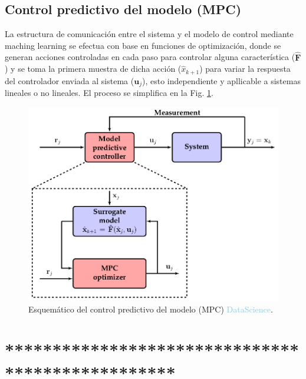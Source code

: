 \subsection*{Control predictivo del modelo (MPC)}

La estructura de comunicación entre el sistema y el modelo de control mediante maching learning se efectua con base en funciones de optimización, donde se generan acciones controladas en cada paso para controlar alguna característica ($\mathbf{\hat{F}}$) y se toma la primera muestra de dicha acción ($\hat{x}_{k+1}$) para variar la respuesta del controlador enviada al sistema ($\mathbf{u}_j$), esto independiente y apllicable a sistemas lineales o no lineales. El proceso se simplifica en la Fig. \ref{fig:mpc}.


\begin{figure}[h]
	\centering
	\includegraphics[scale=0.35]{fig/MPC.png}
	\caption{Esquemático del control predictivo del modelo (MPC) \textcolor{SkyBlue}{DataScience}.}
	\label{fig:mpc}
\end{figure}

\section{*************************************************}







